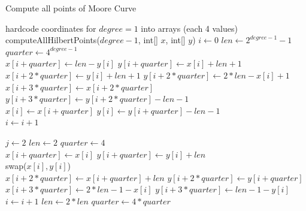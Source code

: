 \documentclass[course=erap]{aspdoc}
\begin{document}
\begin{algorithm}[H]
\begin{algorithmic}
\caption{Compute all points of Moore Curve}
\label{moore:batch}
\State hardcode coordinates for $degree =1$ into arrays (each 4 values)
	\Return
\EndIf	
\State computeAllHilbertPoints($degree - 1$, int[] $x$, int[] $y$)
\State $i \leftarrow 0$
\State $len \leftarrow 2^{degree - 1} -1$ 
\State $quarter \leftarrow 4^{degree-1}$
\\ 
\State $x[i + quarter] \leftarrow len - y[i]$
\State $y[i + quarter] \leftarrow x[i] + len + 1$
\\ 
\State $x[i + 2*quarter] \leftarrow y[i] + len + 1$
\State $y[i + 2*quarter] \leftarrow 2 * len - x[i] + 1$
\\ 
\State $x[i + 3*quarter] \leftarrow x[i + 2*quarter]$
\State $y[i + 3*quarter] \leftarrow y[i + 2*quarter] - len - 1$
\\ 
\State $x[i] \leftarrow x[i + quarter]$
\State $y[i] \leftarrow y[i + quarter] - len - 1$
\\
\State $i \leftarrow i+1$
\EndWhile
\EndFunction



\State $j \leftarrow 2$
\State $len \leftarrow 2$ 
\State $quarter \leftarrow 4$
\\ 
\State $x[i + quarter] \leftarrow x[i]$
\State $y[i + quarter] \leftarrow y[i] + len$
\\ 
\State swap($x[i], y[i]$)
\\ 
\State $x[i + 2*quarter] \leftarrow x[i + quarter] + len$
\State $y[i + 2*quarter] \leftarrow y[i + quarter]$
\\ 
\State $x[i + 3*quarter] \leftarrow 2*len - 1 - x[i]$
\State $y[i + 3*quarter] \leftarrow len - 1 - y[i]$
\\

\EndWhile
\State $i \leftarrow i+1$
\State $len \leftarrow 2*len$
\State $quarter \leftarrow 4*quarter$
\EndWhile
\EndFunction
\end{algorithmic}
\end{algorithm}
\end{document}
